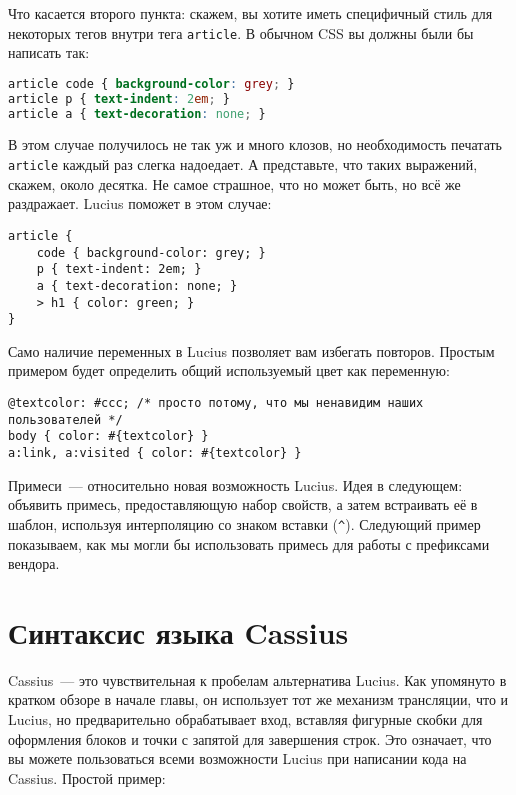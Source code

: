 Что касается второго пункта: скажем, вы хотите иметь специфичный стиль для
некоторых тегов внутри тега \lstinline'article'. В обычном CSS вы должны были бы
написать так:

\begin{lstlisting}[language=CSS]
article code { background-color: grey; }
article p { text-indent: 2em; }
article a { text-decoration: none; }
\end{lstlisting}

В этом случае получилось не так уж и много клозов, но необходимость печатать
\lstinline'article' каждый раз слегка надоедает. А представьте, что таких
выражений, скажем, около десятка. Не самое страшное, что но может быть, но всё
же раздражает. Lucius поможет в этом случае:

\begin{lstlisting}
article {
    code { background-color: grey; }
    p { text-indent: 2em; }
    a { text-decoration: none; }
    > h1 { color: green; }
}
\end{lstlisting}

Само наличие переменных в Lucius позволяет вам избегать повторов.
Простым примером будет определить общий используемый цвет как переменную:

\begin{lstlisting}
@textcolor: #ccc; /* просто потому, что мы ненавидим наших пользователей */
body { color: #{textcolor} }
a:link, a:visited { color: #{textcolor} }
\end{lstlisting}

Примеси~--- относительно новая возможность Lucius. Идея в следующем: объявить
примесь, предоставляющую набор свойств, а затем встраивать её в шаблон,
используя интерполяцию со знаком вставки (\lstinline'^'). Следующий пример
показываем, как мы могли бы использовать примесь для работы с префиксами
вендора.


\section{Синтаксис языка Cassius}

Cassius~--- это чувствительная к пробелам альтернатива Lucius. Как упомянуто в
кратком обзоре в начале главы, он использует тот же механизм трансляции, что и
Lucius, но предварительно обрабатывает вход, вставляя фигурные скобки для
оформления блоков и точки с запятой для завершения строк. Это означает, что вы
можете пользоваться всеми возможности Lucius при написании кода на Cassius.
Простой пример:

